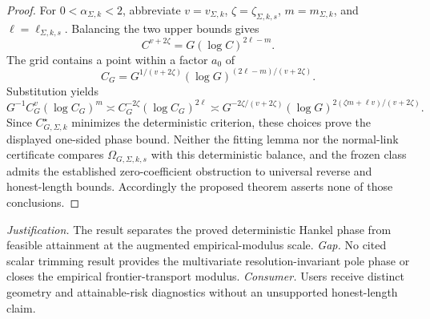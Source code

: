 \documentclass{article}
\begin{document}
\begin{proof}
For \(0<\alpha_{\Sigma,k}<2\), abbreviate \(v=v_{\Sigma,k}\), \(\zeta=\zeta_{\Sigma,k,s}\), \(m=m_{\Sigma,k}\), and \(\ell=\ell_{\Sigma,k,s}\). Balancing the two upper bounds gives
\[
C^{v+2\zeta}=G(\log C)^{2\ell-m}.
\]
The grid contains a point within a factor \(a_0\) of
\[
C_G=G^{1/(v+2\zeta)}(\log G)^{(2\ell-m)/(v+2\zeta)}.
\]
Substitution yields
\[
G^{-1}C_G^v(\log C_G)^m
\asymp C_G^{-2\zeta}(\log C_G)^{2\ell}
\asymp
G^{-2\zeta/(v+2\zeta)}
(\log G)^{2(\zeta m+\ell v)/(v+2\zeta)}.
\]
Since \(C_{G,\Sigma,k}^{\star}\) minimizes the deterministic criterion, these choices prove the displayed one-sided phase bound. Neither the fitting lemma nor the normal-link certificate compares \(\Omega_{G,\Sigma,k,s}\) with this deterministic balance, and the frozen class admits the established zero-coefficient obstruction to universal reverse and honest-length bounds. Accordingly the proposed theorem asserts none of those conclusions.
\end{proof}
\par\smallskip\noindent \textit{Justification.} The result separates the proved deterministic Hankel phase from feasible attainment at the augmented empirical-modulus scale. \textit{Gap.} No cited scalar trimming result provides the multivariate resolution-invariant pole phase or closes the empirical frontier-transport modulus. \textit{Consumer.} Users receive distinct geometry and attainable-risk diagnostics without an unsupported honest-length claim.
\end{document}
